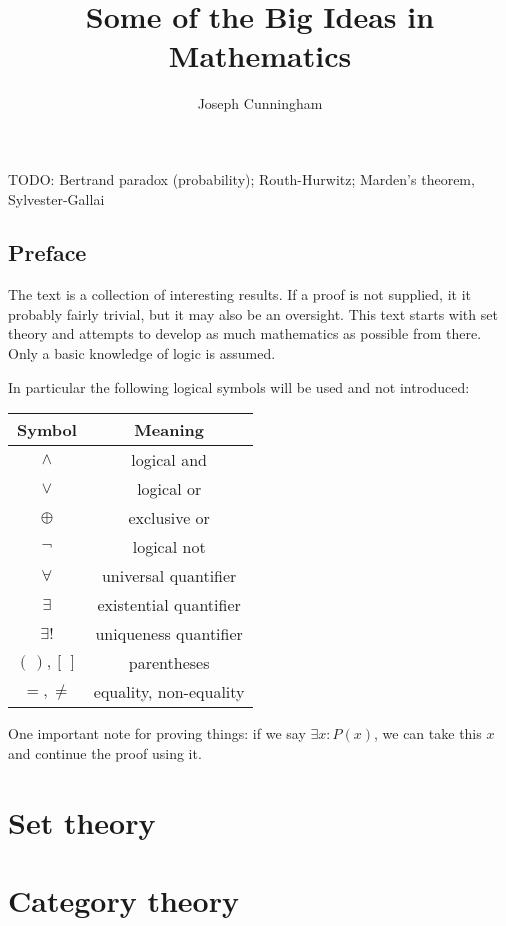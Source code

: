 \documentclass{report}
\title{Some of the Big Ideas in Mathematics}
\author{Joseph Cunningham}
\date{}
\begin{document}
\maketitle
\tableofcontents

TODO: Bertrand paradox (probability); Routh-Hurwitz; Marden's theorem, Sylvester-Gallai

\chapter{Preface}
The text is a collection of interesting results. If a proof is not supplied, it it probably fairly trivial, but it may also be an oversight. This text starts with set theory and attempts to develop as much mathematics as possible from there. Only a basic knowledge of logic is assumed.

In particular the following logical symbols will be used and not introduced:
\begin{center}
\begin{tabular}{ c c }
Symbol & Meaning \\
 \hline
$\land$ & logical and \\
$\lor$ & logical or \\
$\oplus$ & exclusive or \\
$\neg$ & logical not \\
$\forall$ & universal quantifier \\
$\exists$ & existential quantifier \\
$\exists!$ & uniqueness quantifier \\
$(\,), [\,]$ & parentheses \\
$=, \neq$ & equality, non-equality
\end{tabular}
\end{center}

One important note for proving things: if we say $\exists x: P(x)$, we can take this $x$ and continue the proof using it.

\part{Set theory}
\setcounter{chapter}{0} %


\part{Category theory}
\setcounter{chapter}{0} %

\end{document}
